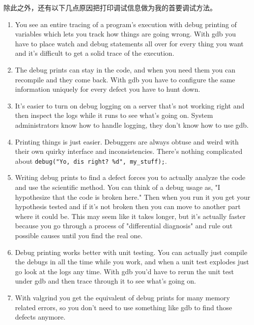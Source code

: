 除此之外，还有以下几点原因把打印调试信息做为我的首要调试方法。
\begin{enumerate}
\item You see an entire tracing of a program's execution with debug printing of variables which lets you
    track how things are going wrong.  With gdb you have to place watch and debug statements all over
    for every thing you want and it's difficult to get a solid trace of the execution.
\item The debug prints can stay in the code, and when you need them you can recompile and they come back.
    With gdb you have to configure the same information uniquely for every defect you have to hunt down.
\item It's easier to turn on debug logging on a server that's not working right and then inspect the logs while
    it runs to see what's going on.  System administrators know how to handle logging, they don't know how
    to use gdb.
\item Printing things is just easier. Debuggers are always obtuse and weird with their own quirky interface and
    inconsistencies.  There's nothing complicated about \verb|debug("Yo, dis right? %d", my_stuff);|.
\item Writing debug prints to find a defect forces you to actually analyze the code and use the scientific method.
    You can think of a debug usage as, "I hypothesize that the code is broken here."  Then when you run it
    you get your hypothesis tested and if it's not broken then you can move to another part where it could be.
    This may seem like it takes longer, but it's actually faster because you go through a process of "differential
    diagnosis" and rule out possible causes until you find the real one.
\item Debug printing works better with unit testing.  You can actually just compile the debugs in all the time
    while you work, and when a unit test explodes just go look at the logs any time.  With gdb you'd have to
    rerun the unit test under gdb and then trace through it to see what's going on.
\item With valgrind you get the equivalent of debug prints for many memory related errors, so you don't need to
    use something like gdb to find those defects anymore.
\end{enumerate}

